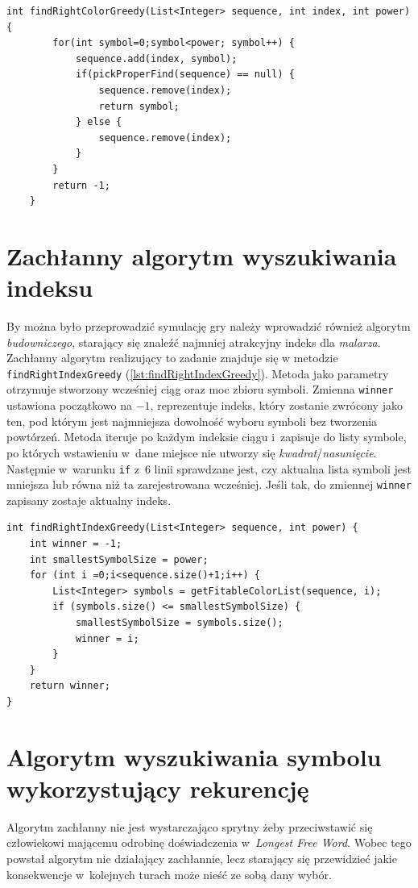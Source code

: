 \documentclass[document]{xmgr}
\begin{document}
\begin{lstlisting}[caption={Metoda zachłannie szukająca symbolu.},label=lst:findRightColorGreedy]
int findRightColorGreedy(List<Integer> sequence, int index, int power) {
		for(int symbol=0;symbol<power; symbol++) {
			sequence.add(index, symbol);
			if(pickProperFind(sequence) == null) {
				sequence.remove(index);
				return symbol;
			} else {
				sequence.remove(index);
			}
		}
		return -1;
	}
\end{lstlisting}
\newpage
\section{Zachłanny algorytm wyszukiwania indeksu}
By można było przeprowadzić symulację gry należy wprowadzić również algorytm \emph{budowniczego}, starający się znaleźć najmniej atrakcyjny indeks dla \emph{malarza}. Zachłanny algorytm realizujący to zadanie znajduje się w metodzie \texttt{findRightIndexGreedy} (\ref{lst:findRightIndexGreedy}). Metoda jako parametry otrzymuje stworzony wcześniej ciąg oraz moc zbioru symboli. Zmienna \texttt{winner} ustawiona początkowo na $-1$, reprezentuje indeks, który zostanie zwrócony jako ten, pod którym jest najmniejsza dowolność wyboru symboli bez tworzenia powtórzeń. Metoda iteruje po każdym indeksie ciągu i~zapisuje do listy symbole, po których wstawieniu w~dane miejsce nie utworzy się \emph{kwadrat}/\emph{nasunięcie}. Następnie w~warunku \texttt{if} z~6 linii sprawdzane jest, czy aktualna lista symboli jest mniejsza lub równa niż ta zarejestrowana wcześniej. Jeśli tak, do zmiennej \texttt{winner} zapisany zostaje aktualny indeks.

\begin{lstlisting}[caption={Metoda zachłannie szukająca indeksu.},label=lst:findRightIndexGreedy]
int findRightIndexGreedy(List<Integer> sequence, int power) {
	int winner = -1;
	int smallestSymbolSize = power;
	for (int i =0;i<sequence.size()+1;i++) {
		List<Integer> symbols = getFitableColorList(sequence, i);
		if (symbols.size() <= smallestSymbolSize) {
			smallestSymbolSize = symbols.size();
			winner = i;
		}
	}
	return winner;
}
\end{lstlisting}

\section{Algorytm wyszukiwania symbolu wykorzystujący rekurencję}
Algorytm zachłanny nie jest wystarczająco sprytny żeby przeciwstawić się człowiekowi mającemu odrobinę doświadczenia w~\emph{Longest Free Word}. Wobec tego powstał algorytm nie działający zachłannie, lecz starający się przewidzieć jakie konsekwencje w~kolejnych turach może nieść ze sobą dany wybór.
\end{document}
